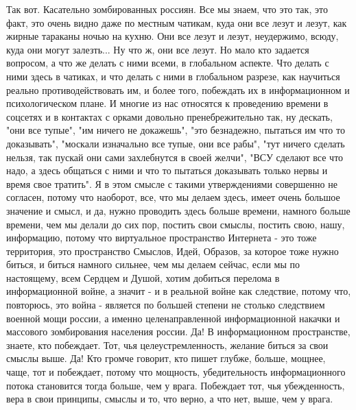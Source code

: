 Так вот. Касательно зомбированных россиян. Все мы знаем, что это так, это факт,
это очень видно даже по местным чатикам, куда они все лезут и лезут, как жирные
тараканы ночью на кухню. Они все лезут и лезут, неудержимо, всюду, куда они
могут залезть...  Ну что ж, они все лезут. Но мало кто задается вопросом, а что
же делать с ними всеми, в глобальном аспекте. Что делать с ними здесь в
чатиках, и что делать с ними в глобальном разрезе, как научиться реально
противодействовать им, и более того, побеждать их в информационном и
психологическом плане.  И многие из нас относятся к проведению времени в
соцсетях и в контактах с орками довольно пренебрежительно так, ну дескать, "они
все тупые", "им ничего не докажешь", "это безнадежно, пытаться им что то
доказывать", "москали изначально все тупые, они все рабы", "тут ничего сделать
нельзя, так пускай они сами захлебнутся в своей желчи", "ВСУ сделают все что
надо, а здесь общаться с ними и что то пытаться доказывать только нервы и время
свое тратить". Я в этом смысле с такими утверждениями совершенно не согласен,
потому что наоборот, все, что мы делаем здесь, имеет очень большое значение и
смысл, и да, нужно проводить здесь больше времени, намного больше времени, чем
мы делали до сих пор, постить свои смыслы, постить свою, нашу, информацию,
потому что виртуальное пространство Интернета - это тоже территория, это
пространство Смыслов, Идей, Образов, за которое тоже нужно биться, и биться
намного сильнее, чем мы делаем сейчас, если мы по настоящему, всем Сердцем и
Душой, хотим добиться перелома в информационной войне, а значит - и в реальной
войне как следствие, потому что, повторюсь, это война - является по большей
степени не столько следствием военной мощи россии, а именно целенаправленной
информационной накачки и массового зомбирования населения россии. Да! В
информационном пространстве, знаете, кто побеждает. Тот, чья
целеустремленность, желание биться за свои смыслы выше. Да! Кто громче говорит,
кто пишет глубже, больше, мощнее, чаще, тот и побеждает, потому что мощность,
убедительность информационного потока становится тогда больше, чем у врага.
Побеждает тот, чья убежденность, вера в свои принципы, смыслы и то, что верно,
а что нет, выше, чем у врага.

